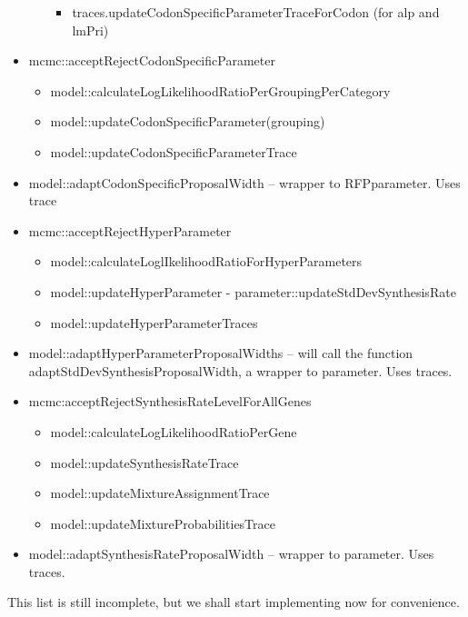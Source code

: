 \documentclass[12pt,hyperref]{labbook}
\newcommand{\sep}{\discretionary{}{}{}} %
\begin{document}
\begin{itemize}
\begin{itemize}
\begin{itemize}
            \item traces.updateCodonSpecificParameterTraceForCodon (for alp and lmPri)
        \end{itemize}
    \end{itemize}
    \item mcmc::acceptRejectCodonSpecificParameter
    \begin{itemize}
        \item model::calculateLogLikelihoodRatioPerGroupingPerCategory
        \item model::updateCodonSpecificParameter(grouping)
        \item model::updateCodonSpecificParameterTrace
    \end{itemize}
    \item model::\sep adapt\sep Codon\sep Specific\sep Proposal\sep Width -- 
    wrapper to RFP\sep parameter. Uses trace
    \item mcmc::acceptRejectHyperParameter
    \begin{itemize}
        \item model::calculateLoglIkelihoodRatioForHyperParameters
        \item model::updateHyperParameter - parameter::updateStdDevSynthesisRate
        \item model::updateHyperParameterTraces
    \end{itemize}
    \item model::\sep adapt\sep Hyper\sep Parameter\sep Proposal\sep Widths -- 
    will call the function adapt\sep Std\sep Dev\sep Synthesis\sep Proposal\sep Width,
    a wrapper to parameter. Uses traces.
    \item mcmc:acceptRejectSynthesisRateLevelForAllGenes
    \begin{itemize}
        \item model::calculateLogLikelihoodRatioPerGene
        \item model::updateSynthesisRateTrace
        \item model::updateMixtureAssignmentTrace
        \item model::updateMixtureProbabilitiesTrace
    \end{itemize}
    \item model::adaptSynthesisRateProposalWidth -- wrapper to parameter. Uses traces.
\end{itemize}

This list is still incomplete, but we shall start implementing now for convenience.
\end{document}
